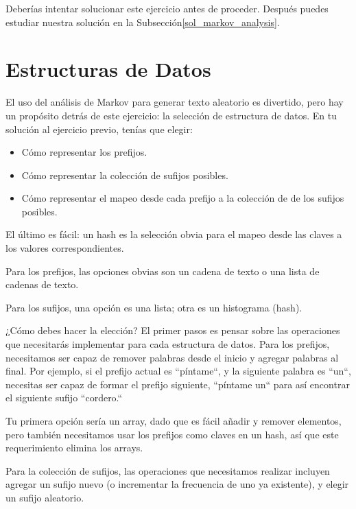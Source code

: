 Deberías intentar solucionar este ejercicio antes de proceder. 
Después puedes estudiar nuestra solución en la Subsección\ref{sol_markov_analysis}.


\section{Estructuras de Datos}

El uso del análisis de Markov para generar texto aleatorio es divertido,
pero hay un propósito detrás de este ejercicio: la selección de estructura
de datos. En tu solución al ejercicio previo, tenías que elegir:

\begin{itemize}

\item Cómo representar los prefijos.

\item Cómo representar la colección de sufijos posibles.

\item Cómo representar el mapeo desde cada prefijo a la colección de
de los sufijos posibles.

\end{itemize}

El último es fácil: un hash es la selección obvia para 
el mapeo desde las claves a los valores correspondientes.

Para los prefijos, las opciones obvias son un cadena de texto
o una lista de cadenas de texto.

Para los sufijos, una opción es una lista; otra es un histograma (hash).

¿Cómo debes hacer la elección? El primer pasos es pensar sobre las operaciones
que necesitarás implementar para cada estructura de datos. Para los prefijos,
necesitamos ser capaz de remover palabras desde el inicio y agregar palabras
al final. Por ejemplo, si el prefijo actual es ``píntame``, y la siguiente
palabra es ``un``, necesitas ser capaz de formar el prefijo siguiente, 
``píntame un`` para así encontrar el siguiente sufijo ``cordero.``  

Tu primera opción sería un array, dado que es fácil añadir y remover elementos,
pero también necesitamos usar los prefijos como claves en un hash, 
así que este requerimiento elimina los arrays.

Para la colección de sufijos, las operaciones que necesitamos realizar  
incluyen agregar un sufijo nuevo (o incrementar la frecuencia de uno ya existente),
y elegir un sufijo aleatorio.

